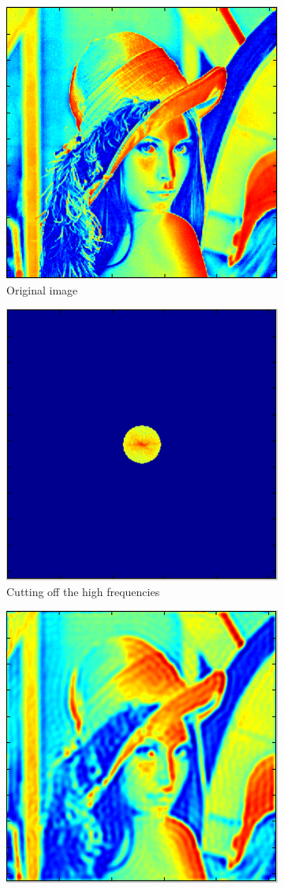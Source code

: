 \documentclass[a4paper, 10pt, conference] {article}
\begin{document}
\begin{figure}[H]
	\centering
	\begin{subfigure}{0.32\textwidth} 
		\centering						
		\includegraphics[scale=0.5]{reportImages/exp2_lena.PNG}
		\caption{Original image}
	\end{subfigure}
	\begin{subfigure}{0.32\textwidth}
		\centering
		\includegraphics[scale=0.5]{reportImages/exp2_lena_filer_01.PNG}
		\caption{Cutting off the high frequencies}
	\end{subfigure}
	\begin{subfigure}{0.32\textwidth}
		\centering
		\includegraphics[scale=0.5]{reportImages/exp2_lena_filered_01.PNG}

\end{subfigure}
\end{figure}
\end{document}
